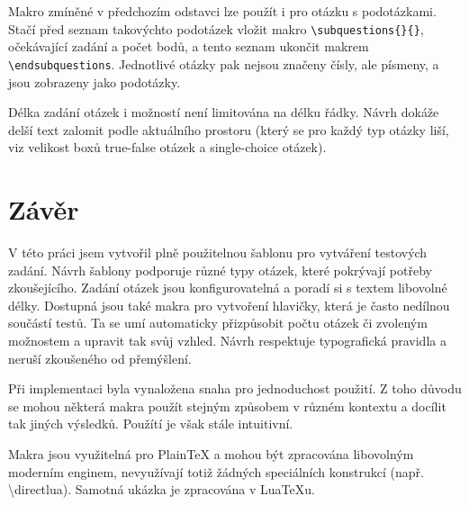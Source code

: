 \documentclass{article}
\begin{document}
    Makro zmíněné v předchozím odstavci lze použít i pro otázku s podotázkami. Stačí před seznam takovýchto podotázek
    vložit makro \texttt{\textbackslash subquestions\{\}\{\}}, očekávající zadání a počet bodů, a tento
    seznam ukončit makrem \texttt{\textbackslash endsubquestions}. Jednotlivé otázky pak nejsou značeny čísly, ale písmeny, a
    jsou zobrazeny jako podotázky.

    Délka zadání otázek i možností není limitována na délku řádky. Návrh dokáže delší text zalomit podle
    aktuálního prostoru (který se pro každý typ otázky liší, viz velikost boxů true-false otázek a single-choice otázek). 

\section{Závěr}
    V této práci jsem vytvořil plně použitelnou šablonu pro vytváření testových zadání. Návrh šablony podporuje
    různé typy otázek, které pokrývají potřeby zkoušejícího. Zadání otázek jsou konfigurovatelná a poradí si s textem libovolné
    délky. Dostupná jsou také makra pro vytvoření hlavičky, která je často nedílnou součástí testů. Ta se umí automaticky
    přizpůsobit počtu otázek či zvoleným možnostem a upravit tak svůj vzhled. Návrh respektuje typografická pravidla
    a neruší zkoušeného od přemýšlení.

    Při implementaci byla vynaložena snaha pro jednoduchost použití. Z toho důvodu se mohou některá makra použít stejným způsobem
    v různém kontextu a docílit tak jiných výsledků. Použítí je však stále intuitivní.

    Makra jsou využitelná pro Plain\TeX{} a mohou být zpracována libovolným moderním enginem, nevyužívají
    totiž žádných speciálních konstrukcí (např. \textbackslash directlua). Samotná ukázka je zpracována v Lua\TeX{}u.  
\end{document}
